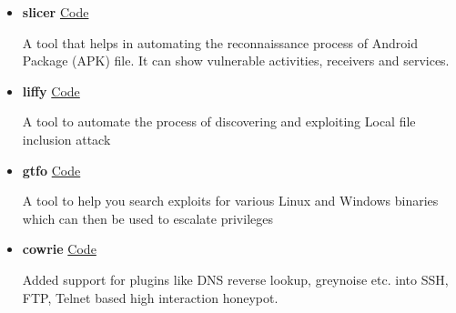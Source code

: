 \documentclass[10pt,a4paper,ragged2e]{altacv}
\begin{document}
  \begin{itemize}
  \item {\color{black} \normalsize \textbf{slicer}} \hfill {\color{accent} \faGithub \href{https://github.com/mzfr/slicer}{ \hspace{0.5mm}Code}}

  A tool that helps in automating the reconnaissance process of Android Package (APK) file. It can show vulnerable activities, receivers and services.

  \divider

  \item {\color{black} \normalsize \textbf{liffy}} \hfill {\color{accent} \faGithub \href{https://github.com/liffy}{ \hspace{0.5mm}Code}}

  A tool to automate the process of discovering and exploiting Local file inclusion attack

  \divider

  \item {\color{black} \normalsize \textbf{gtfo}} \hfill {\color{accent} \faGithub \href{https://github.com/gtfo}{ \hspace{0.5mm}Code}}

  A tool to help you search exploits for various Linux and Windows binaries which can then be used to escalate privileges

  \divider

  \item {\color{black} \normalsize \textbf{cowrie}} \hfill {\color{accent} \faGithub \href{https://github.com/cowrie/cowrie/commits?author=mzfr}{ \hspace{0.5mm}Code}}

  Added support for plugins like DNS reverse lookup, greynoise etc. into SSH, FTP, Telnet based high interaction honeypot.


  \end{itemize}

  \clearpage

  
\end{document}
